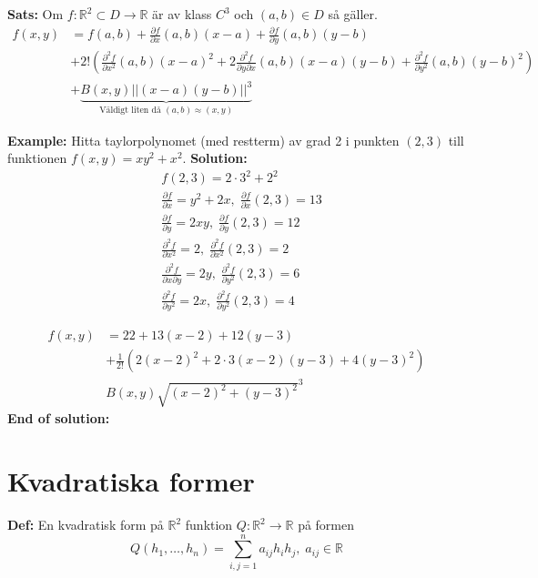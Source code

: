 \textbf{Sats:} 
Om $f: \mathbb{R}^2\subset D \to\mathbb{R}$ är av klass $C^3$
och $(a,b)\in D$ så gäller.
\begin{align*}
    f(x,y) &= f(a,b) 
    +\frac{\partial f}{\partial x}(a,b)(x-a) 
    +\frac{\partial f}{\partial y}(a,b)(y-b) \\
    &+2!\left( 
    \frac{\partial^2 f}{\partial x^2}(a,b)(x-a)^2 
    +2\frac{\partial^2 f}{\partial y\partial x}(a,b)(x-a)(y-b)
    +\frac{\partial^2 f}{\partial y^2}(a,b)(y-b)^2 
    \right) \\
    &+\underbrace{B(x,y)||(x-a)(y-b)||^3}_{\text{Väldigt liten då } (a,b)\approx(x,y)}
\end{align*}

\textbf{Example:} 
Hitta taylorpolynomet (med restterm) av grad 2 i punkten $(2,3)$
till funktionen $f(x,y) = xy^2+x^2$.
\textbf{Solution:} 
\begin{align*}
    &f(2,3) = 2\cdot3^2+2^2 \\
    &\frac{\partial f}{\partial x} = y^2 + 2x,\; \frac{\partial f}{\partial x}(2,3) = 13 \\
    &\frac{\partial f}{\partial y} = 2xy,\; \frac{\partial f}{\partial y}(2,3) = 12 \\
    &\frac{\partial^2 f}{\partial x^2} = 2,\; \frac{\partial^2 f}{\partial x^2}(2,3) = 2 \\
    &\frac{\partial^2 f}{\partial x\partial y} = 2y,\; \frac{\partial^2 f}{\partial y^2}(2,3) = 6 \\
    &\frac{\partial^2 f}{\partial y^2} = 2x,\; \frac{\partial^2 f}{\partial y^2}(2,3) = 4
\end{align*}

\begin{align*}
    f(x,y) &= 22 + 13(x-2) + 12(y-3) \\
    &+\frac{1}{2!}(2(x-2)^2 +2\cdot3(x-2)(y-3) +4(y-3)^2) \\
    &B(x,y)\sqrt{(x-2)^2 +(y-3)^2}^3
\end{align*}
\textbf{End of solution:} 


\section{Kvadratiska former}
\textbf{Def:} En kvadratisk form på $\mathbb{R}^2$
funktion $Q: \mathbb{R}^2\to\mathbb{R}$ på formen
\begin{equation*}
    Q(h_1,\ldots,h_n) = \sum^{n}_{i,j=1} a_{ij}h_ih_j,\; a_{ij}\in\mathbb{R}
\end{equation*}

